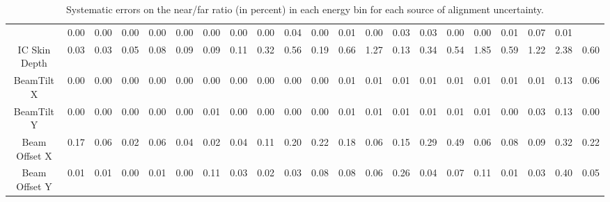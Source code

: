 \begin{sidewaystable}[ht]
\begin{tabular}{|c | c c c c c c c c c c c c c c c c c c c c | }
 & 0.00
 & 0.00
 & 0.00
 & 0.00
 & 0.00
 & 0.00
 & 0.00
 & 0.00
 & 0.04
 & 0.00
 & 0.01
 & 0.00
 & 0.03
 & 0.03
 & 0.00
 & 0.00
 & 0.01
 & 0.07
 & 0.01
\\
IC Skin Depth & 0.03
 & 0.03
 & 0.05
 & 0.08
 & 0.09
 & 0.09
 & 0.11
 & 0.32
 & 0.56
 & 0.19
 & 0.66
 & 1.27
 & 0.13
 & 0.34
 & 0.54
 & 1.85
 & 0.59
 & 1.22
 & 2.38
 & 0.60
\\
BeamTilt X & 0.00
 & 0.00
 & 0.00
 & 0.00
 & 0.00
 & 0.00
 & 0.00
 & 0.00
 & 0.00
 & 0.00
 & 0.01
 & 0.01
 & 0.01
 & 0.01
 & 0.01
 & 0.01
 & 0.01
 & 0.01
 & 0.13
 & 0.06
\\
BeamTilt Y & 0.00
 & 0.00
 & 0.00
 & 0.00
 & 0.00
 & 0.01
 & 0.00
 & 0.00
 & 0.00
 & 0.00
 & 0.01
 & 0.01
 & 0.01
 & 0.01
 & 0.01
 & 0.01
 & 0.00
 & 0.03
 & 0.13
 & 0.00
\\
Beam Offset X & 0.17
 & 0.06
 & 0.02
 & 0.06
 & 0.04
 & 0.02
 & 0.04
 & 0.11
 & 0.20
 & 0.22
 & 0.18
 & 0.06
 & 0.15
 & 0.29
 & 0.49
 & 0.06
 & 0.08
 & 0.09
 & 0.32
 & 0.22
\\
Beam Offset Y & 0.01
 & 0.01
 & 0.00
 & 0.01
 & 0.00
 & 0.11
 & 0.03
 & 0.02
 & 0.03
 & 0.08
 & 0.08
 & 0.06
 & 0.26
 & 0.04
 & 0.07
 & 0.11
 & 0.01
 & 0.03
 & 0.40
 & 0.05
\\

\hline
\end{tabular}
\label{tab:errorsummary}
\caption{Systematic errors on the near/far ratio (in percent) in each energy bin for each source of alignment uncertainty.}
\end{sidewaystable}
